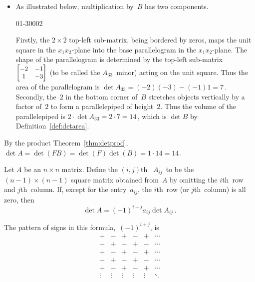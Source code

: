 \begin{example}
\begin{solution}
\begin{itemize}
\begin{itemize}
\item As illustrated  below, multiplication by~\(B\) has two components.
\begin{center}
01{-3}000{2}
\end{center}
Firstly,  the \(2\times2\) top-left sub-matrix, being bordered by zeros, maps the unit square in the \(x_1x_2\)-plane into the base parallelogram in the \(x_1x_2\)-plane.
The shape of the parallelogram is determined by the top-left sub-matrix \(\small\begin{bmatrix} -2&-1\\1&-3 \end{bmatrix}\) (to be called the \(A_{33}\)~minor) acting on the unit square.
Thus the area of the parallelogram is \(\det A_{33}=(-2)(-3)-(-1)1=7\)\,.
Secondly, the~\(2\) in the bottom corner of~\(B\) stretches objects vertically by a factor of~\(2\) to form a parallelepiped of height~\(2\).
Thus the volume of the parallelepiped is \(2\cdot\det A_{33}=2\cdot 7=14\)\,, which is \(\det B\) by Definition~\ref{def:detarea}.

\end{itemize}
By the product Theorem~\ref{thm:detprod},
\(\det A=\det(FB)=\det(F)\det(B)=1\cdot14=14\)\,.

\end{itemize}
\end{solution}
\end{example}











\begin{theorem} \label{thm:rpdet:vii} 
Let \(A\) be an \(n\times n\) matrix.
Define the \((i,j)\)th~ \(A_{ij}\)~to be the \((n-1)\times(n-1)\) square matrix obtained from~\(A\) by omitting the \(i\)th~row and \(j\)th~column.  
If, except for the entry~\(a_{ij}\), the \(i\)th~row (or \(j\)th~column) is all zero, then 
\begin{equation}
\det A=(-1)^{i+j}a_{ij}\det A_{ij}\,.
\label{eq:rpdet:vii}
\end{equation}
\end{theorem}
The pattern of signs in this formula,~\((-1)^{i+j}\), is 
\begin{equation*}
\begin{matrix} +&-&+&-&+&\cdots
\\-&+&-&+&-&\cdots
\\+&-&+&-&+&\cdots
\\-&+&-&+&-&\cdots
\\+&-&+&-&+&\cdots
\\\vdots&\vdots&\vdots&\vdots&\vdots&\ddots \end{matrix}
\end{equation*}

